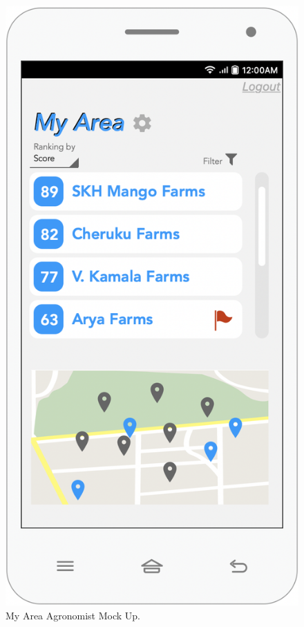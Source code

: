 \begin{multicols}{3}
\begin{figure}[H]
\centering
\includegraphics[scale=0.35]{../images_diagrams/mock_ups/myarea100.png}
\caption{\label{fig:mock_area}My Area Agronomist Mock Up.}
\end{figure}



\end{multicols}
